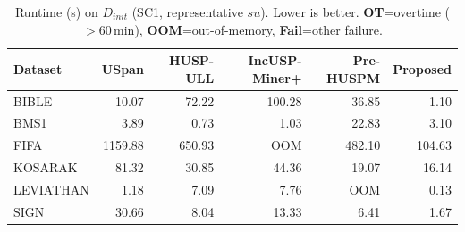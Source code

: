 \begin{table}[t]
\centering
\caption{Runtime (s) on $D_{init}$ (SC1, representative $su$). Lower is better. \textbf{OT}=overtime ($>$60\,min), \textbf{OOM}=out-of-memory, \textbf{Fail}=other failure.}
\label{tab:sc1_runtime}
\begin{tabular}{lrrrrr}
\toprule
Dataset & USpan & HUSP-ULL & IncUSP-Miner+ & Pre-HUSPM & Proposed \\
\midrule
BIBLE & 10.07 & 72.22 & 100.28 & 36.85 & 1.10 \\
BMS1 & 3.89 & 0.73 & 1.03 & 22.83 & 3.10 \\
FIFA & 1159.88 & 650.93 & OOM & 482.10 & 104.63 \\
KOSARAK & 81.32 & 30.85 & 44.36 & 19.07 & 16.14 \\
LEVIATHAN & 1.18 & 7.09 & 7.76 & OOM & 0.13 \\
SIGN & 30.66 & 8.04 & 13.33 & 6.41 & 1.67 \\
\bottomrule
\end{tabular}
\end{table}
